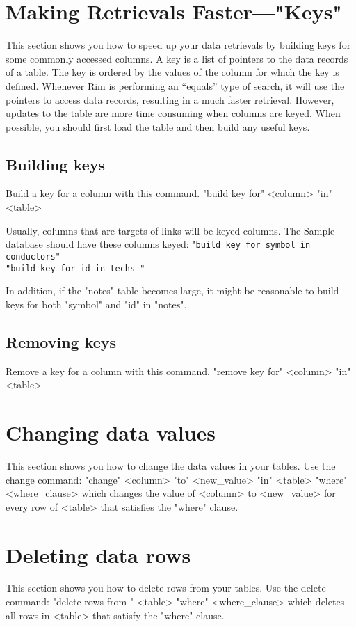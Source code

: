 \section{Making Retrievals Faster---"Keys"}
%
This section shows you how to speed up your data retrievals
by building keys for some commonly accessed columns.
A key is a list of pointers to the data records
of a table. The key is ordered by the values of the column
for which the key is defined.
Whenever Rim is performing an ``equals'' type of search,
it will use the pointers to access data records, resulting in
a much faster retrieval.
However, updates to the table are more time consuming when
columns are keyed.  When possible, you should first load
the table and then build any useful keys.
 
\subsection{Building keys}
%
Build a key for a column with this command.
\<"build key for" <column> "in" <table>\>
 
Usually, columns that are targets of links will be
keyed columns.
The Sample database should have these columns keyed:
\<"\tt build key for symbol in conductors"\\
             "\tt build key for id     in techs     "\>
 
In addition,
if the "notes" table becomes large, it might be reasonable
to build keys for both "symbol" and "id" in "notes".
 
\subsection{Removing keys}
%
Remove a key for a column with this command.
\<"remove key for" <column> "in" <table>\>
 
 
\section{Changing data values}
%
This section shows you how to change the data values in your tables.
Use the change command:
\<"change" <column> "to" <new_value> "in" <table>
           "where" <where_clause>\>
which changes the value of <column> to <new_value> for every
row of <table> that satisfies the "where" clause.
 
\section{Deleting data rows}
%
This section shows you how to delete rows from your tables.
Use the delete command:
\<"delete rows from " <table> "where" <where_clause>\>
which deletes all rows in <table> that
satisfy the "where" clause.
 
